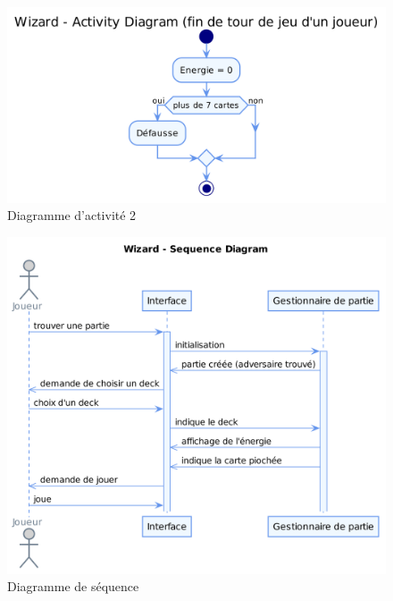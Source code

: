 \documentclass[11pt,a4paper]{article}
\begin{document}
\begin{figure}[ht]
  \centering
  \includegraphics[width=1\textwidth]{uml_files/ActivityDiagram2.png}
  \caption{\label{fig:class} Diagramme d'activité 2}
\end{figure}

\begin{figure}[ht]
  \centering
  \includegraphics[width=1\textwidth]{uml_files/SequenceDiagram.png}
  \caption{\label{fig:class} Diagramme de séquence}
\end{figure}

\clearpage
\glsaddall
\printnoidxglossaries
\end{document}
